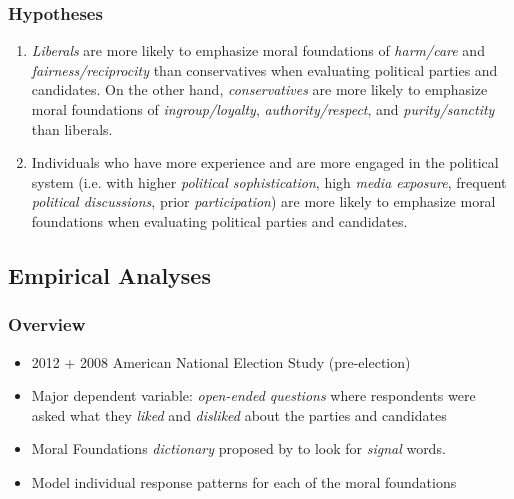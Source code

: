 \begin{frame}%
  \frametitle{Hypotheses}
  \begin{enumerate}
    \item \emph{Liberals} are more likely to emphasize moral foundations of \emph{harm/care} and \emph{fairness/reciprocity} than conservatives when evaluating political parties and candidates. On the other hand, \emph{conservatives} are more likely to emphasize moral foundations of \emph{ingroup/loyalty}, \emph{authority/respect}, and \emph{purity/sanctity} than liberals.
    \item Individuals who have more experience and are more engaged in the political system (i.e. with higher \emph{political sophistication}, high \emph{media exposure}, frequent \emph{political discussions}, prior \emph{participation}) are more likely to emphasize moral foundations when evaluating political parties and candidates.
  \end{enumerate}
\end{frame}

\subsection{Empirical Analyses}

\begin{frame}%
  \frametitle{Overview}
  \begin{itemize}
    \item 2012 + 2008 American National Election Study (pre-election)
    \item Major dependent variable: \emph{open-ended questions} where respondents were asked what they \emph{liked} and \emph{disliked} about the parties and candidates
    \item Moral Foundations \emph{dictionary} proposed by \citep{graham2009liberals} to look for \emph{signal} words.
    \item Model individual response patterns for each of the moral foundations
  \end{itemize}
\end{frame}


